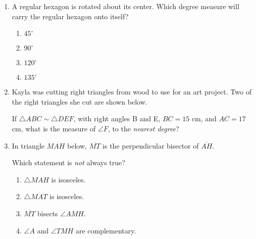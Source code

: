 \documentclass[12pt, oneside]{article}
\begin{document}
\begin{enumerate}[itemsep=0.5cm]
\item A regular hexagon is rotated about its center. Which degree measure will carry the regular hexagon onto itself? 
\begin{multicols}{2}
  \begin{enumerate}
    \item $45^\circ$
    \item $90^\circ$
    \item $120^\circ$
    \item $135^\circ$
  \end{enumerate}
\end{multicols}

\newpage
\item Kayla was cutting right triangles from wood to use for an art project. Two of the right triangles she cut are shown below.
  \begin{center}
  \end{center}
If $\triangle ABC \sim \triangle DEF$, with right angles B and E, $BC=15$ cm, and $AC=17$ cm, what is the measure of $\angle F$, to the \emph{nearest degree}?

\item In triangle $MAH$ below, $\overline{MT}$ is the perpendicular bisector of $\overline{AH}$.
  \begin{center}
  \end{center}
Which statement is \emph{not} always true?
  \begin{enumerate}
    \item $\triangle MAH$ is isosceles.
    \item $\triangle MAT$ is isosceles.
    \item $\overline{MT}$ bisects $\angle AMH$.
    \item $\angle A$ and $\angle TMH$ are complementary.
  \end{enumerate}


\end{enumerate}
\end{document}
